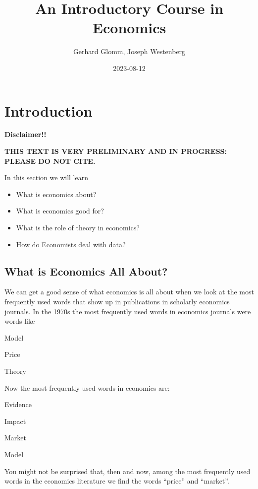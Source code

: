 \documentclass[
]{book}
\title{An Introductory Course in Economics}
\author{Gerhard Glomm, Joseph Westenberg}
\date{2023-08-12}
\providecommand{\tightlist}{%
  \setlength{\itemsep}{0pt}\setlength{\parskip}{0pt}}
\begin{document}
\maketitle

{
\setcounter{tocdepth}{1}
\tableofcontents
}
\hypertarget{intro}{%
\chapter{Introduction}\label{intro}}

\textbf{Disclaimer!!}

\textbf{THIS TEXT IS VERY PRELIMINARY AND IN PROGRESS: PLEASE DO NOT CITE.}

In this section we will learn

\begin{itemize}
\tightlist
\item
  What is economics about?
\item
  What is economics good for?
\item
  What is the role of theory in economics?
\item
  How do Economists deal with data?
\end{itemize}

\hypertarget{what-is-economics-all-about}{%
\section{What is Economics All About?}\label{what-is-economics-all-about}}

We can get a good sense of what economics is all about when we look at the most frequently used words that show up in publications in scholarly economics journals. In the 1970s the most frequently used words in economics journals were words like

\begin{center}
Model

Price

Theory

\end{center}

Now the most frequently used words in economics are:

\begin{center}
Evidence

Impact

Market

Model

\end{center}

You might not be surprised that, then and now, among the most frequently used words in the economics literature we find the words ``price'' and ``market''.
\end{document}
